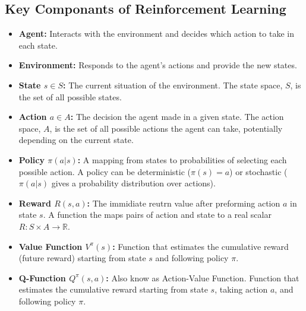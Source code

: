 \documentclass[12pt,a4paper]{report}
\begin{document}
\subsection{Key Componants of Reinforcement Learning}
\begin{itemize}
    \item \textbf{Agent:} Interacts with the environment and decides which action to take in each state.
    \item \textbf{Environment:} Responds to the agent's actions and provide the new states.
    \item \textbf{State $s{\in}S$:} The current situation of the environment. The state space, $S$, is the set of all possible states.
    \item \textbf{Action $a{\in}A$:} The decision the agent made in a given state. The action space, $A$, is the set of all possible actions the agent can take, potentially depending on the current state.
    \item \textbf{Policy $\pi(a|s)$:} A mapping from states to probabilities of selecting each possible action. A policy can be deterministic ($\pi(s)=a$) or stochastic ($\pi(a|s)$ gives a probability distribution over actions).
    \item \textbf{Reward $R(s,a)$:} The immidiate reutrn value after preforming action $a$ in state $s$. A function the maps pairs of action and state to a real scalar $R:S\times A\rightarrow \mathbb{R}$.
    \item \textbf{Value Function $V^{\pi}(s)$:} Function that estimates the cumulative reward (future reward) starting from state $s$ and following policy $\pi$.
    \item \textbf{Q-Function $Q^{\pi}(s,a)$:} Also know as Action-Value Function. Function that estimates the cumulative reward starting from state $s$, taking action $a$, and following policy $\pi$.
\end{itemize}
\end{document}

